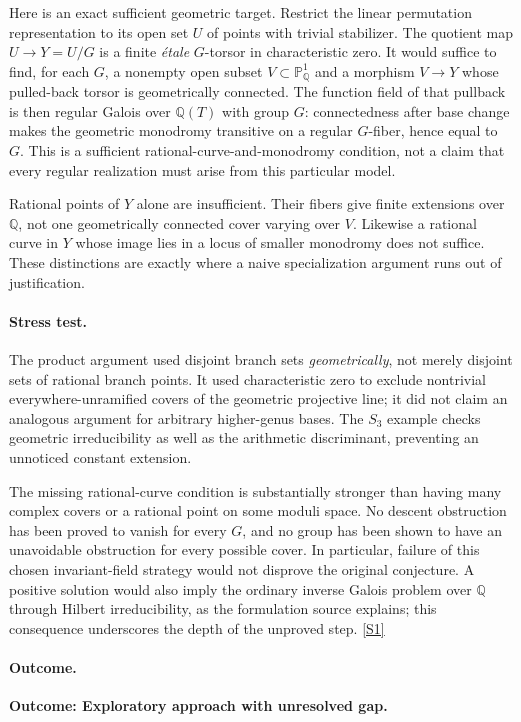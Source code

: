 \documentclass[11pt,a4paper]{article}
\newcommand{\Q}{\mathbb{Q}}
\newcommand{\PP}{\mathbb P}
\newcommand{\sref}[2]{\hyperlink{source:#1:#2}{[S#2]}}
\numberwithin{equation}{section}
\begin{document}
Here is an exact sufficient geometric target.  Restrict the linear
permutation representation to its open set $U$ of points with trivial
stabilizer.  The quotient map $U\to Y=U/G$ is a finite \emph{\'{e}tale}
$G$-torsor in characteristic zero.  It would suffice to find, for each
$G$, a nonempty open subset $V\subset\PP^1_{\Q}$ and a morphism
$V\to Y$ whose pulled-back torsor is geometrically connected.  The
function field of that pullback is then regular Galois over $\Q(T)$
with group $G$: connectedness after base change makes the geometric
monodromy transitive on a regular $G$-fiber, hence equal to $G$.
This is a sufficient rational-curve-and-monodromy condition, not a claim
that every regular realization must arise from this particular model.

Rational points of $Y$ alone are insufficient.  Their fibers give
finite extensions over $\Q$, not one geometrically connected cover
varying over $V$.  Likewise a rational curve in $Y$ whose image lies in
a locus of smaller monodromy does not suffice.  These distinctions are
exactly where a naive specialization argument runs out of justification.

\paragraph{Stress test.}
The product argument used disjoint branch sets \emph{geometrically},
not merely disjoint sets of rational branch points.  It used
characteristic zero to exclude nontrivial everywhere-unramified covers
of the geometric projective line; it did not claim an analogous argument
for arbitrary higher-genus bases.  The $S_3$ example checks geometric
irreducibility as well as the arithmetic discriminant, preventing an
unnoticed constant extension.

The missing rational-curve condition is substantially stronger than
having many complex covers or a rational point on some moduli space.
No descent obstruction has been proved to vanish for every $G$, and no
group has been shown to have an unavoidable obstruction for every possible
cover.  In particular, failure of this chosen invariant-field strategy
would not disprove the original conjecture.  A positive solution would
also imply the ordinary inverse Galois problem over $\Q$ through Hilbert
irreducibility, as the formulation source explains; this consequence
underscores the depth of the unproved step. \sref{30006738}{1}

\paragraph{Outcome.}
\textbf{Outcome: Exploratory approach with unresolved gap.}
\end{document}
